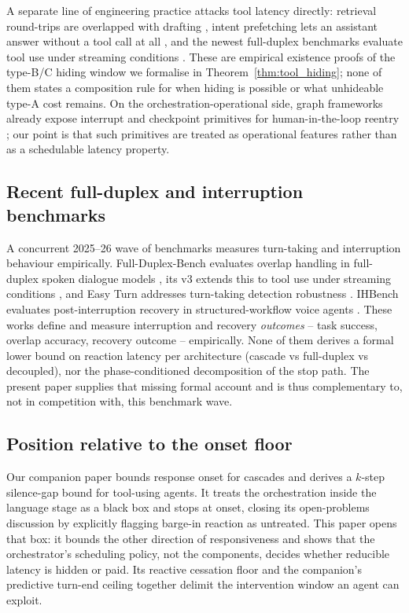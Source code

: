 A separate line of engineering practice attacks tool latency directly: retrieval
round-trips are overlapped with drafting \citep{specrag2024}, intent prefetching lets an
assistant answer without a tool call at all \citep{agentsnotenough2024}, and the newest
full-duplex benchmarks evaluate tool use under streaming conditions
\citep{lin2026fdbv3}.
These are empirical existence proofs of the type-B/C hiding window we formalise in
Theorem~\ref{thm:tool_hiding}; none of them states a composition rule for when hiding is
possible or what unhideable type-A cost remains.
On the orchestration-operational side, graph frameworks already expose interrupt and
checkpoint primitives for human-in-the-loop reentry \citep{langgraph2024}; our point is that
such primitives are treated as operational features rather than as a schedulable latency
property.

\subsection{Recent full-duplex and interruption benchmarks}
A concurrent 2025--26 wave of benchmarks measures turn-taking and interruption behaviour
empirically.
Full-Duplex-Bench evaluates overlap handling in full-duplex spoken dialogue models
\citep{lin2025fullduplexbench}, its v3 extends this to tool use under streaming conditions
\citep{lin2026fdbv3}, and Easy Turn addresses turn-taking detection robustness
\citep{li2025easyturn}.
IHBench evaluates post-interruption recovery in structured-workflow voice agents
\citep{salimi2026ihbench}.
These works define and measure interruption and recovery \emph{outcomes} -- task success,
overlap accuracy, recovery outcome -- empirically.
None of them derives a formal lower bound on reaction latency per architecture (cascade vs
full-duplex vs decoupled), nor the phase-conditioned decomposition of the stop path.
The present paper supplies that missing formal account and is thus complementary to, not in
competition with, this benchmark wave.

\subsection{Position relative to the onset floor}
Our companion paper \citep{latencyfloor2025} bounds response onset for cascades and derives a
$k$-step silence-gap bound
for tool-using agents.
It treats the orchestration inside the language stage as a black box and stops at onset,
closing its open-problems discussion by explicitly flagging barge-in reaction as
untreated.
This paper opens that box: it bounds the other direction of responsiveness and shows that the
orchestrator's scheduling policy, not the components, decides whether reducible latency is
hidden or paid.
Its reactive cessation floor and the companion's predictive turn-end ceiling together delimit
the intervention window an agent can exploit.
